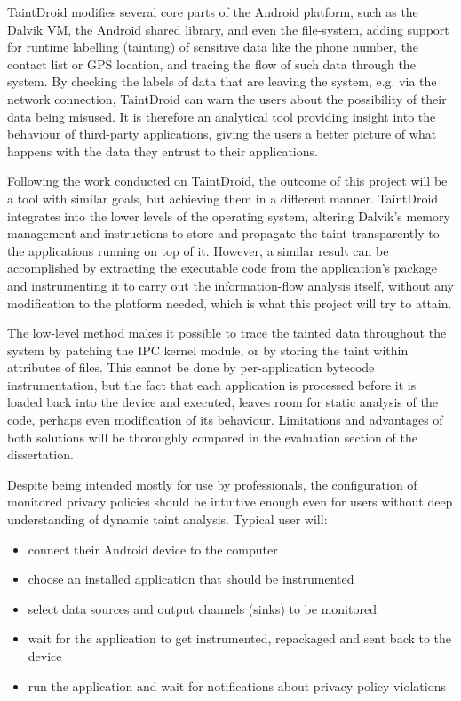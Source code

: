 \documentclass[12pt]{article}
\begin{document}
TaintDroid modifies several core parts of the Android platform, such as 
the Dalvik VM, the Android shared library, and even the file-system, 
adding support for runtime labelling (tainting) of sensitive data like the 
phone number, the contact list or GPS location, and tracing the flow of such 
data through the system. By checking the labels of data that are leaving the 
system, e.g. via the network connection, TaintDroid can warn the users about 
the possibility of their data being misused. It is therefore an analytical 
tool providing insight into the behaviour of third-party applications, giving 
the users a better picture of what happens with the data they entrust to 
their applications.

Following the work conducted on TaintDroid, the outcome of this project 
will be a tool with similar goals, but achieving them in a different 
manner. TaintDroid integrates into the lower levels of the operating 
system, altering Dalvik's memory management and instructions to store and
propagate the taint transparently to the applications running on top of 
it. However, a similar result can be accomplished by extracting the 
executable code from the application's package and instrumenting it to 
carry out the information-flow analysis itself, without any modification 
to the platform needed, which is what this project will try to attain.

The low-level method makes it possible to trace the tainted data 
throughout the system by patching the IPC kernel module, or by storing the 
taint within attributes of files. This cannot be done by per-application 
bytecode instrumentation, but the fact that each application is processed 
before it is loaded back into the device and executed, leaves room for static 
analysis of the code, perhaps even modification of its behaviour. Limitations 
and advantages of both solutions will be thoroughly compared in the evaluation 
section of the dissertation.

Despite being intended mostly for use by professionals, the configuration 
of monitored privacy policies should be intuitive enough even for users 
without deep understanding of dynamic taint analysis. Typical user will:
\begin{itemize}
\item{connect their Android device to the computer}
\item{choose an installed application that should be instrumented}
\item{select data sources and output channels (sinks) to be monitored}
\item{wait for the application to get instrumented, repackaged and sent
      back to the device}
\item{run the application and wait for notifications about privacy policy
      violations}
\end{itemize}
\end{document}
